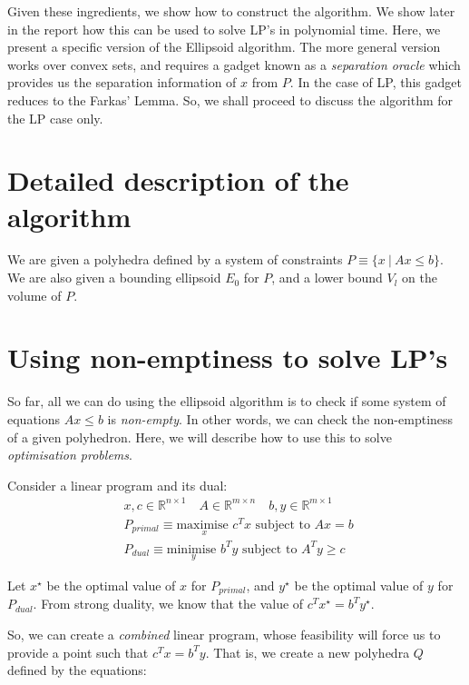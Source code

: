 \documentclass[conference]{IEEEtran}
\begin{document}
Given these ingredients, we show how to construct the algorithm.  We show later
in the report how this can be used to solve LP's in polynomial time. Here, we
present a specific version of the Ellipsoid algorithm. The more general version
works over convex sets, and requires a gadget known as a \textit{separation
oracle} which provides us the separation information of $x$ from $P$. In the
case of LP, this gadget reduces to the Farkas' Lemma. So, we shall proceed to
discuss the algorithm for the LP case only.


\section{Detailed description of the algorithm}
We are given a polyhedra defined by a system of constraints $P \equiv \{ x ~|~
Ax \leq b \}$. We are also given a bounding ellipsoid $E_0$  for $P$, and a
lower bound $V_l$ on the volume of $P$.



\section{Using non-emptiness to solve LP's}
So far, all we can do using the ellipsoid algorithm is to check if some
system of equations $Ax \leq b$ is \textit{non-empty}. In other words, we
can check the non-emptiness of a given polyhedron. Here, we will describe how
to use this to solve \textit{optimisation problems}.

Consider a linear program and its dual:
\begin{align*}
        &x, c \in \mathbb R^{n \times 1} \quad A \in \mathbb R^{m \times n} \quad b, y \in \mathbb R^{m \times 1}\\
        &P_{primal} \equiv \underset{x}{\text{maximise }} c^T x \text{ subject to } Ax = b \\
        &P_{dual} \equiv \underset{y}{\text{minimise }} b^T y \text{ subject to } A^Ty \geq c \quad
\end{align*}

Let $x^\star$ be the optimal value of $x$ for $P_{primal}$, and $y^\star$ be the
optimal value of $y$ for $P_{dual}$. From strong duality, we know that
the value of $c^Tx^\star = b^Ty^\star$.

So, we can create a \textit{combined} linear program, whose feasibility will
force us to provide a point such that $c^Tx = b^T y$. That is, we create
a new polyhedra $Q$ defined by the equations:
\end{document}
